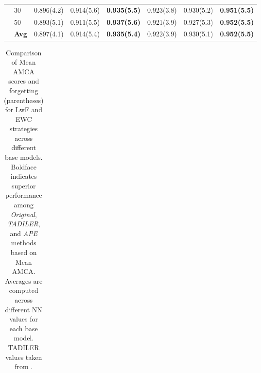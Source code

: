 \documentclass[pdflatex,sn-mathphys-num]{sn-jnl}%
\theoremstyle{thmstyleone}%
\theoremstyle{thmstyletwo}%
\theoremstyle{thmstylethree}%
\begin{document}
\begin{table}
{\begin{tabular}{llcccccc}
 & 30 & 0.896(4.2) & 0.914(5.6) & \textbf{0.935(5.5)} & 0.923(3.8) & 0.930(5.2) & \textbf{0.951(5.5)} \\
 & 50 & 0.893(5.1) & 0.911(5.5) & \textbf{0.937(5.6)} & 0.921(3.9) & 0.927(5.3) & \textbf{0.952(5.5)} \\
  \cmidrule(lr){2-8}
 & \textbf{Avg} & 0.897(4.1) & 0.914(5.4) & \textbf{0.935(5.4)} & 0.922(3.9) & 0.930(5.1) & \textbf{0.952(5.5)} \\
  \midrule
  \bottomrule
  \end{tabular}}
\end{table}



\begin{table}
\centering
\tiny
  {\caption{Comparison of Mean AMCA scores and forgetting (parentheses) for LwF and EWC strategies across different base models. Boldface
indicates superior performance among \textit{Original}, \textit{TADILER}, and \textit{APE} methods based on Mean AMCA. Averages are
computed across different NN values for each base model. TADILER values taken from \cite{BravoRocca2025}.}
  \label{tab:amca_comparison_lwf_ewc}
}
  {\begin{tabular}{llcccccc}
  

\end{tabular}}
\end{table}
\end{document}
